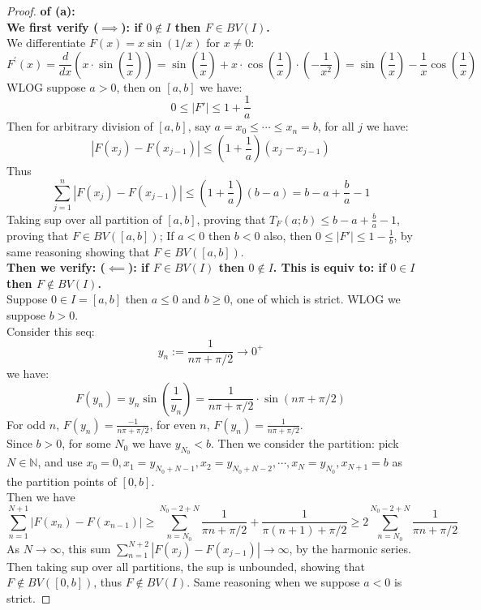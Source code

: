 \documentclass[lang=cn,11pt]{elegantbook}
\begin{document}
\begin{proof}
    \textbf{of (a):}\\
 \textbf{We first verify ($\implies$): if $0 \not\in I$ then $F \in BV(I)$.}\\
We differentiate $F(x)=x \sin (1 / x)$ for $x \neq 0$:
$$
F^{\prime}(x)=\frac{d}{d x}\left(x \cdot \sin \left(\frac{1}{x}\right)\right)=\sin \left(\frac{1}{x}\right)+x \cdot \cos \left(\frac{1}{x}\right) \cdot\left(-\frac{1}{x^2}\right)=\sin \left(\frac{1}{x}\right)-\frac{1}{x} \cos \left(\frac{1}{x}\right)
$$
WLOG suppose $a > 0$, then on $[a,b]$ we have:  \[
0  \leq  |F' | \leq  1 + \frac{1}{a}
\]
Then for arbitrary division of $[a,b]$, say $a = x_0 \leq \cdots \leq x_n = b$, for all $j$ we have:  \[
|F (x_j) - F(x_{j-1}) | \leq (  1 + \frac{1}{a}) (x_j - x_{j-1})
\]
Thus \[
\sum_{j=1}^n |F (x_j) - F(x_{j-1}) | \leq  (  1 + \frac{1}{a} )(b-a) = b-a + \frac{b}{a} - 1
\]
Taking sup over all partition of $[a,b]$, proving that $T_F(a;b) \leq b-a + \frac{b}{a} - 1$, proving that $F \in BV([a,b])$; If $a < 0$ then $b < 0$ also, then $0  \leq |F'|  \leq 1 - \frac{1}{b}$, by same reasoning showing that $F \in BV([a,b])$.\\

\textbf{Then we verify:  ($\impliedby$): if $F \in BV(I)$ then  $0 \not\in I$. This is equiv to: if $0 \in I $ then $F \not \in BV(I)$.}\\
Suppose $0 \in I= [a,b] $ then $a \leq  0$ and $b \geq  0 $, one of which is strict. WLOG we suppose $b > 0$. \\
Consider this seq: 
$$
y_n:=\frac{1}{n \pi+\pi / 2} \rightarrow 0^{+}
$$
we have:
$$
F\left(y_n\right)=y_n \sin \left(\frac{1}{y_n}\right)=\frac{1}{n \pi+\pi / 2} \cdot \sin (n \pi+\pi / 2)
$$For odd $n$, $F(y_n) = \frac{-1}{n \pi+\pi / 2}$, for even $n$, $F({y_n}) =  \frac{1}{n \pi+\pi / 2}$.\\
Since $b > 0$, for some $N_0$ we have $y_{N_0} < b$. 
Then we consider the partition: pick $N \in \mathbb{N}$, and use $ x_0 = 0,x_1 = y_{N_0 + N-1},x_2 =y_{N_0 +N-2},\cdots, x_{N} = y_{N_0},x_{N+1} = b$ as the partition points of $[0,b]$.\\
Then we have \[
\sum_{n=1}^{N+1} |F (x_n) - F(x_{n-1}) | \geq  \sum_{n=N_0}^{N_0 -2+ N}  \frac{1}{\pi n+\pi / 2} + \frac{1}{\pi (n+1)+\pi / 2} \geq 2\sum_{n=N_0}^{N_0 -2+ N} \frac{1}{\pi n+\pi / 2}
\]
As $N \to \infty$, this sum $\sum_{n=1}^{N+2} |F (x_j) - F(x_{j-1}) |  \to \infty$, by the harmonic series. Then taking sup over all partitions, the sup is unbounded, showing that $F \not \in BV([0,b])$, thus $F\not \in BV(I)$. Same reasoning when we suppose $a < 0$ is strict.
\end{proof}
\end{document}
